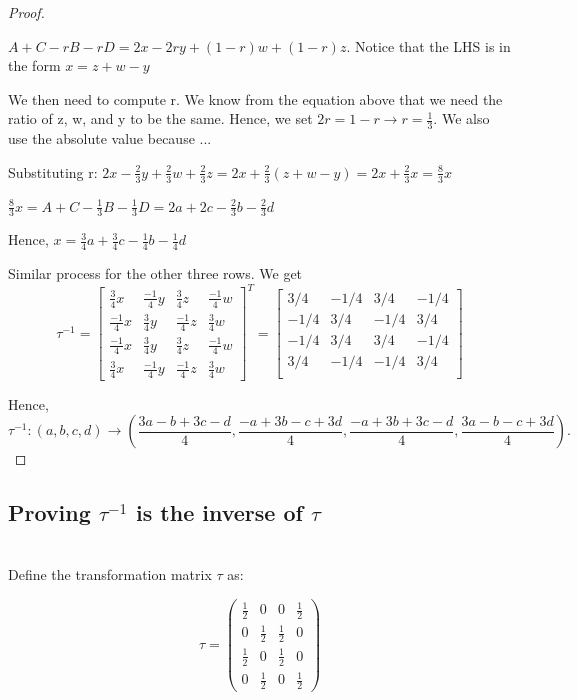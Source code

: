 \documentclass[11pt]{amsart}
\theoremstyle{definition}
\begin{document}
\begin{proof}
\begin{center}
    $A + C - rB - rD = 2x - 2ry + (1-r)w + (1-r)z$. Notice that the LHS is in the form $x = z + w - y$

    We then need to compute r. We know from the equation above that we need the ratio of z, w, and y to be the same. Hence, we set $2r = 1-r \rightarrow r = \frac{1}{3}$. We also use the absolute value because ...

    Substituting r: $2x - \frac{2}{3}y + \frac{2}{3}w + \frac{2}{3}z = 2x + \frac{2}{3}(z + w - y) = 2x + \frac{2}{3}x = \frac{8}{3}x$ 

    $\frac{8}{3}x = A + C - \frac{1}{3}B - \frac{1}{3}D = 2a + 2c - \frac{2}{3}b - \frac{2}{3}d$

    Hence, $x = \frac{3}{4}a + \frac{3}{4}c - \frac{1}{4}b - \frac{1}{4}d$
\end{center}

Similar process for the other three rows. We get 
\[
\tau^{-1} = \begin{bmatrix}
\frac{3}{4}x & \frac{-1}{4}y & \frac{3}{4}z & \frac{-1}{4}w\\
\frac{-1}{4}x & \frac{3}{4}y & \frac{-1}{4}z & \frac{3}{4}w \\
\frac{-1}{4}x & \frac{3}{4}y & \frac{3}{4}z & \frac{-1}{4}w \\
\frac{3}{4}x & \frac{-1}{4}y & \frac{-1}{4}z & \frac{3}{4}w
\end{bmatrix}^T = \begin{bmatrix}
3/4 & -1/4 & 3/4 & -1/4 \\
-1/4 & 3/4 & -1/4 & 3/4 \\
-1/4 & 3/4 & 3/4 & -1/4 \\
3/4 & -1/4 & -1/4 & 3/4 \\
\end{bmatrix}
\]

Hence,
\[
\tau^{-1}: (a,b,c,d) \to \left( \frac{3a- b + 3c - d}{4}, \frac{-a + 3b - c + 3d}{4}, \frac{-a + 3b + 3c - d}{4}, \frac{3a - b - c + 3d}{4} \right).
\]

\end{proof}

\subsection{Proving $\tau^{-1}$ is the inverse of $\tau$}
\hfill\\

Define the transformation matrix $\tau$ as:

\[
\tau = \begin{pmatrix}
\frac{1}{2} & 0 & 0 & \frac{1}{2} \\
0 & \frac{1}{2} & \frac{1}{2} & 0 \\
\frac{1}{2} & 0 & \frac{1}{2} & 0 \\
0 & \frac{1}{2} & 0 & \frac{1}{2}
\end{pmatrix}
\]
\end{document}
